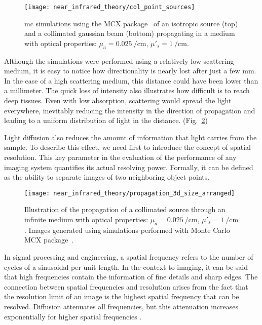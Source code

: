 \begin{figure}[t]
\centering
\texttt{[image: near\_infrared\_theory/col\_point\_sources]}
\caption[\gls{mc} simulations of a point source and a collimated beam]{\gls{mc} simulations using the MCX package~\cite{Fang2009} of an isotropic source (top) and a collimated gaussian beam (bottom) propagating in a medium with optical properties: $\mu_a=\SI[per-mode=reciprocal]{0.025}{\per\cm}$, $\mu'_s=\SI[per-mode=reciprocal]{1}{\per\cm}$.}
\label{fig:theory_col_point_src} 
\end{figure}

Although the simulations were performed using a relatively low scattering medium, it is easy to notice how directionality is nearly lost after just a few mm. In the case of a high scattering medium, this distance could have been lower than a millimeter. The quick loss of intensity also illustrates how difficult is to reach deep tissues. Even with low absorption, scattering would spread the light everywhere, inevitably reducing the intensity in the direction of propagation and leading to a uniform distribution of light in the distance.
(Fig.~\ref{fig:theory_propagation_3d})

Light diffusion also reduces the amount of information that light carries from the sample. To describe this effect, we need first to introduce the concept of spatial resolution. This key parameter in the evaluation of the performance of any imaging system quantifies its actual resolving power. Formally, it can be defined as the ability to separate images of two neighboring object points.

\begin{figure}[t!]
\centering
\texttt{[image: near\_infrared\_theory/propagation\_3d\_size\_arranged]}
\caption[Propagation of a collimated source in an infinite medium]{Illustration of the propagation of a collimated source through an infinite medium with optical properties: $\mu_a=\SI[per-mode=reciprocal]{0.025}{\per\cm}$, $\mu'_s=\SI[per-mode=reciprocal]{1}{\per\cm}$. Images generated using simulations performed with Monte Carlo MCX package~\cite{Fang2009}.}
\label{fig:theory_propagation_3d} 
\end{figure}

In signal processing and engineering, a spatial frequency refers to the number of cycles of a sinusoidal per unit length. In the context to imaging, it can be said that high frequencies contain the information of fine details and sharp edges. The connection between spatial frequencies and resolution arises from the fact that the resolution limit of an image is the highest spatial frequency that can be resolved. Diffusion attenuates all frequencies, but this attenuation increases exponentially for higher spatial frequencies \cite{Ripoll1999}.

